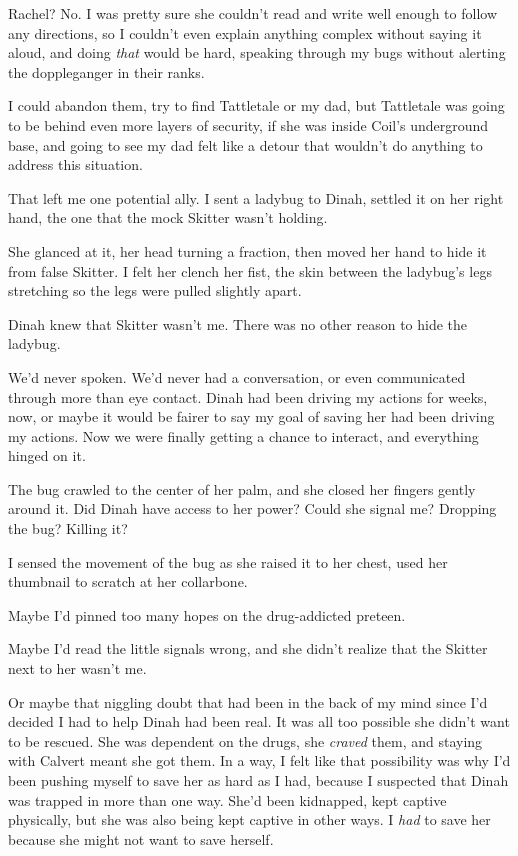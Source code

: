 Rachel?  No.  I was pretty sure she couldn't read and write well enough to follow any directions, so I couldn't even explain anything complex without saying it aloud, and doing \emph{that} would be hard, speaking through my bugs without alerting the doppleganger in their ranks.



I could abandon them, try to find Tattletale or my dad, but Tattletale was going to be behind even more layers of security, if she was inside Coil's underground base, and going to see my dad felt like a detour that wouldn't do anything to address this situation.



That left me one potential ally.  I sent a ladybug to Dinah, settled it on her right hand, the one that the mock Skitter wasn't holding.



She glanced at it, her head turning a fraction, then moved her hand to hide it from false Skitter.  I felt her clench her fist, the skin between the ladybug's legs stretching so the legs were pulled slightly apart.



Dinah knew that Skitter wasn't me.  There was no other reason to hide the ladybug.



We'd never spoken.  We'd never had a conversation, or even communicated through more than eye contact.  Dinah had been driving my actions for weeks, now, or maybe it would be fairer to say my goal of saving her had been driving my actions.  Now we were finally getting a chance to interact, and everything hinged on it.



The bug crawled to the center of her palm, and she closed her fingers gently around it.  Did Dinah have access to her power?  Could she signal me?  Dropping the bug?  Killing it?



I sensed the movement of the bug as she raised it to her chest, used her thumbnail to scratch at her collarbone.



Maybe I'd pinned too many hopes on the drug-addicted preteen.



Maybe I'd read the little signals wrong, and she didn't realize that the Skitter next to her wasn't me.



Or maybe that niggling doubt that had been in the back of my mind since I'd decided I had to help Dinah had been real.  It was all too possible she didn't want to be rescued.  She was dependent on the drugs, she \emph{craved} them, and staying with Calvert meant she got them.  In a way, I felt like that possibility was why I'd been pushing myself to save her as hard as I had, because I suspected that Dinah was trapped in more than one way.  She'd been kidnapped, kept captive physically, but she was also being kept captive in other ways.  I \emph{had} to save her because she might not want to save herself.



